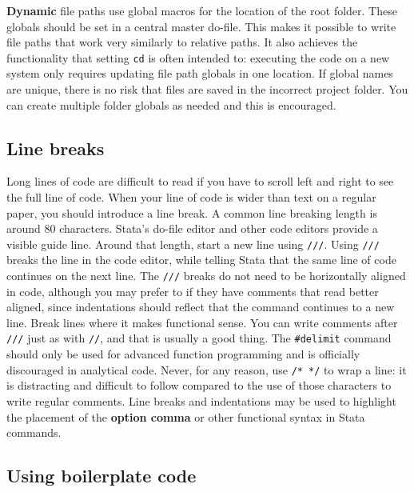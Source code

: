 \textbf{Dynamic} file paths use global macros for the location of the root folder.
These globals should be set in a central master do-file.
This makes it possible to write file paths that work very similarly to relative paths.
It also achieves the functionality that setting \texttt{cd} is often intended to:
executing the code on a new system only requires updating file path globals in one location.
If global names are unique, there is no risk that files are saved in the incorrect project folder.
You can create multiple folder globals as needed and this is encouraged.


\subsection{Line breaks}

Long lines of code are difficult to read if you have to scroll left and right to see the full line of code.
When your line of code is wider than text on a regular paper, you should introduce a line break.
A common line breaking length is around 80 characters.
Stata's do-file editor and other code editors provide a visible guide line.
Around that length, start a new line using \texttt{///}.
Using \texttt{///} breaks the line in the code editor,
while telling Stata that the same line of code continues on the next line.
The \texttt{///} breaks do not need to be horizontally aligned in code,
although you may prefer to if they have comments that read better aligned,
since indentations should reflect that the command continues to a new line.
Break lines where it makes functional sense.
You can write comments after \texttt{///} just as with \texttt{//}, and that is usually a good thing.
The \texttt{\#delimit} command should only be used for advanced function programming
and is officially discouraged in analytical code.\cite{cox2005styleguide}
Never, for any reason, use \texttt{/* */} to wrap a line:
it is distracting and difficult to follow compared to the use
of those characters to write regular comments.
Line breaks and indentations may be used to highlight the placement
of the \textbf{option comma} or other functional syntax in Stata commands.


\subsection{Using boilerplate code}

